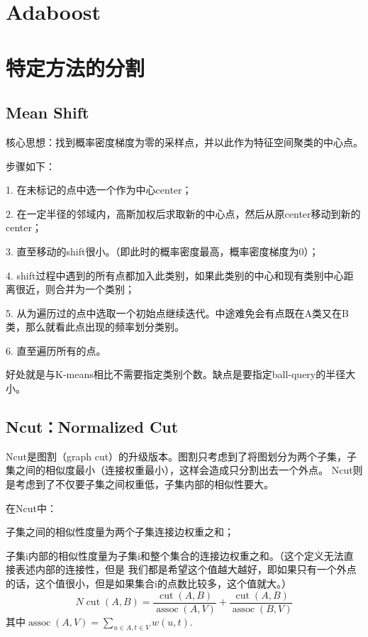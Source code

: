 \documentclass[12pt]{article}
\begin{document}
\section{Adaboost}

\section{特定方法的分割}
\subsection{Mean Shift}
核心思想：找到概率密度梯度为零的采样点，并以此作为特征空间聚类的中心点。

步骤如下：

1. 在未标记的点中选一个作为中心center；

2. 在一定半径的邻域内，高斯加权后求取新的中心点，然后从原center移动到新的center；

3. 直至移动的shift很小。（即此时的概率密度最高，概率密度梯度为0）；

4. shift过程中遇到的所有点都加入此类别，如果此类别的中心和现有类别中心距离很近，则合并为一个类别；

5. 从为遍历过的点中选取一个初始点继续迭代。中途难免会有点既在A类又在B类，那么就看此点出现的频率划分类别。

6. 直至遍历所有的点。

好处就是与K-means相比不需要指定类别个数。缺点是要指定ball-query的半径大小。

\subsection{Ncut：Normalized Cut}
Ncut是图割（graph cut）的升级版本。图割只考虑到了将图划分为两个子集，子集之间的相似度最小（连接权重最小），这样会造成只分割出去一个外点。
Ncut则是考虑到了不仅要子集之间权重低，子集内部的相似性要大。

在Ncut中：

子集之间的相似性度量为两个子集连接边权重之和；

子集i内部的相似性度量为子集i和整个集合的连接边权重之和。（这个定义无法直接表述内部的连接性，但是
我们都是希望这个值越大越好，即如果只有一个外点的话，这个值很小，但是如果集合i的点数比较多，这个值就大。）
\begin{equation}
    \nonumber
    N \operatorname{cut}(A, B)=\frac{\operatorname{cut}(A, B)}{\operatorname{assoc}(A, V)}+\frac{\operatorname{cut}(A, B)}{\operatorname{assoc}(B, V)}
\end{equation}
其中$\operatorname{assoc}(A, V)=\sum_{u \in A, t \in V} w(u, t)$.
\end{document}
